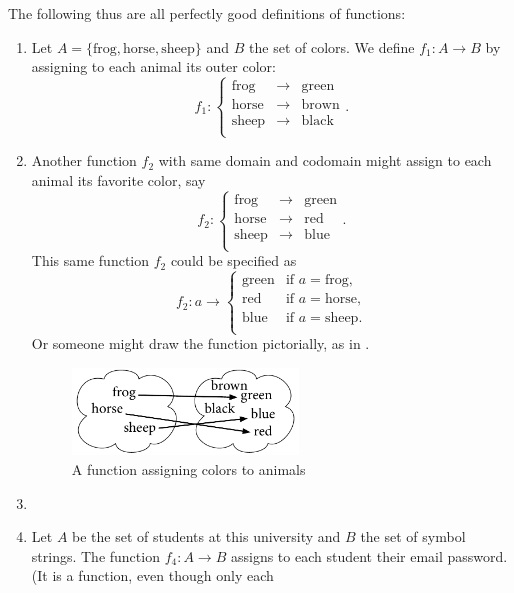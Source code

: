 The following thus are all perfectly good definitions of functions:
\begin{enumerate}
\item  Let $A=\{\mbox{frog},\mbox{horse},\mbox{sheep}\}$ and $B$ the set of
colors. We define $f_1\colon A\to B$ by assigning to each animal its outer
color:
\[
f_1\colon \left\{\begin{array}{lcl}
\mbox{frog}&\to&\mbox{green}\\
\mbox{horse}&\to&\mbox{brown}\\
\mbox{sheep}&\to&\mbox{black}\\
\end{array}
\right..
\]

\item Another function $f_2$ with same domain and codomain might assign to each animal its favorite color, say
\[
f_2\colon \left\{\begin{array}{lcl}
\mbox{frog}&\to&\mbox{green}\\
\mbox{horse}&\to&\mbox{red}\\
\mbox{sheep}&\to&\mbox{blue}\\
\end{array}
\right..
\]
This same function $f_2$ could be specified as
\[
f_2\colon a\to\left\{\begin{array}{ll}
\mbox{green}&\mbox{if $a=$frog,}\\
\mbox{red}&\mbox{if $a=$horse,}\\
\mbox{blue}&\mbox{if $a=$sheep.}\\
\end{array}
\right.
\]
Or someone might draw the function pictorially, as in
.
\begin{figure}[t]
\begin{center}
\includegraphics[width=6cm]{pic/AnimalColor.pdf}
\end{center}
\caption{A function assigning colors to animals}
\label{figfroghorsesheep}
\end{figure}
\item 
\item Let $A$ be the set of students at this university and $B$ the set of
symbol strings. The function $f_4\colon A\to B$ assigns to each student
their email password. (It is a function, even though only each

\end{enumerate}
